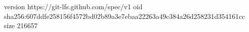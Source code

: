 version https://git-lfs.github.com/spec/v1
oid sha256:607ddfe258156f4572bd02b89a3e7ebaa22263a49c384a26d258231d354161cc
size 216657
